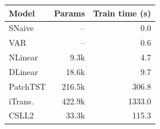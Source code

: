\begin{tabular}{lrr}
\toprule
Model & Params & Train time (s) \\
\midrule
SNaive & -- & 0.0 \\
VAR & -- & 0.6 \\
NLinear & 9.3k & 4.7 \\
DLinear & 18.6k & 9.7 \\
PatchTST & 216.5k & 306.8 \\
iTrans. & 422.9k & 1333.0 \\
CSLL2 & 33.3k & 115.3 \\
\bottomrule
\end{tabular}
